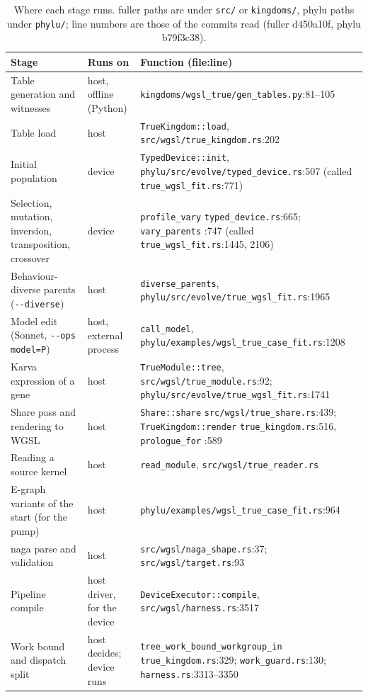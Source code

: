 \documentclass[sigconf,nonacm]{acmart}
\newcommand{\code}[1]{\nolinkurl{#1}}
\newcommand{\src}[1]{{\footnotesize\nolinkurl{#1}}}
\begin{document}
\begin{table}[t]
\caption{Where each stage runs. fuller paths are under \src{src/} or
\src{kingdoms/}, phylu paths under \src{phylu/}; line numbers are those of the
commits read (fuller d450a10f, phylu b79f3c38).}
\label{tab:where}
\small
\begin{tabularx}{\textwidth}{@{}lp{2.2cm}X@{}}
\toprule
Stage & Runs on & Function (file:line)\\
\midrule
Table generation and witnesses & host, offline (Python) & \src{kingdoms/wgsl_true/gen_tables.py}:81--105\\
Table load & host & \code{TrueKingdom::load}, \src{src/wgsl/true_kingdom.rs}:202\\
Initial population & device & \code{TypedDevice::init}, \src{phylu/src/evolve/typed_device.rs}:507 (called \src{true_wgsl_fit.rs}:771)\\
Selection, mutation, inversion, transposition, crossover & device & \code{profile_vary} \src{typed_device.rs}:665; \code{vary_parents} :747 (called \src{true_wgsl_fit.rs}:1445, 2106)\\
Behaviour-diverse parents (\code{--diverse}) & host & \code{diverse_parents}, \src{phylu/src/evolve/true_wgsl_fit.rs}:1965\\
Model edit (Sonnet, \code{--ops model=P}) & host, external process & \code{call_model}, \src{phylu/examples/wgsl_true_case_fit.rs}:1208\\
Karva expression of a gene & host & \code{TrueModule::tree}, \src{src/wgsl/true_module.rs}:92; \src{phylu/src/evolve/true_wgsl_fit.rs}:1741\\
Share pass and rendering to WGSL & host & \code{Share::share} \src{src/wgsl/true_share.rs}:439; \code{TrueKingdom::render} \src{true_kingdom.rs}:516, \code{prologue_for} :589\\
Reading a source kernel & host & \code{read_module}, \src{src/wgsl/true_reader.rs}\\
E-graph variants of the start (for the pump) & host & \src{phylu/examples/wgsl_true_case_fit.rs}:964\\
naga parse and validation & host & \src{src/wgsl/naga_shape.rs}:37; \src{src/wgsl/target.rs}:93\\
Pipeline compile & host driver, for the device & \code{DeviceExecutor::compile}, \src{src/wgsl/harness.rs}:3517\\
Work bound and dispatch split & host decides; device runs & \code{tree_work_bound_workgroup_in} \src{true_kingdom.rs}:329; \src{work_guard.rs}:130; \src{harness.rs}:3313--3350\\

\end{tabularx}
\end{table}
\end{document}
